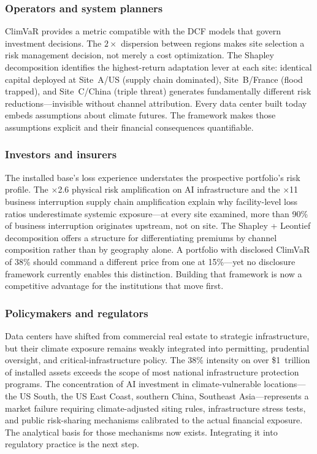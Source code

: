 \begin{twocolbody}

\subsubsection*{Operators and system planners}

ClimVaR provides a metric compatible with the DCF models that govern investment decisions. The $2\times$ dispersion between regions makes site selection a risk management decision, not merely a cost optimization. The Shapley decomposition identifies the highest-return adaptation lever at each site: identical capital deployed at Site~A/US (supply chain dominated), Site~B/France (flood trapped), and Site~C/China (triple threat) generates fundamentally different risk reductions---invisible without channel attribution. Every data center built today embeds assumptions about climate futures. The framework makes those assumptions explicit and their financial consequences quantifiable.

\subsubsection*{Investors and insurers}

The installed base's loss experience understates the prospective portfolio's risk profile. The $\times$2.6 physical risk amplification on AI infrastructure and the $\times$11 business interruption supply chain amplification explain why facility-level loss ratios underestimate systemic exposure---at every site examined, more than 90\% of business interruption originates upstream, not on site. The Shapley + Leontief decomposition offers a structure for differentiating premiums by channel composition rather than by geography alone. A portfolio with disclosed ClimVaR of 38\% should command a different price from one at 15\%---yet no disclosure framework currently enables this distinction. Building that framework is now a competitive advantage for the institutions that move first.

\subsubsection*{Policymakers and regulators}

Data centers have shifted from commercial real estate to strategic infrastructure, but their climate exposure remains weakly integrated into permitting, prudential oversight, and critical-infrastructure policy. The 38\% intensity on over \$1~trillion of installed assets exceeds the scope of most national infrastructure protection programs. The concentration of AI investment in climate-vulnerable locations---the US South, the US East Coast, southern China, Southeast Asia---represents a market failure requiring climate-adjusted siting rules, infrastructure stress tests, and public risk-sharing mechanisms calibrated to the actual financial exposure. The analytical basis for those mechanisms now exists. Integrating it into regulatory practice is the next step.


\end{twocolbody}

